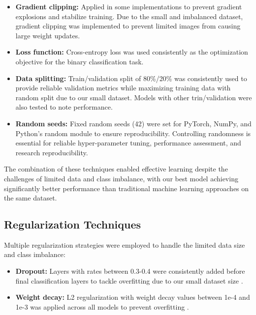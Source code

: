 \documentclass[a4paper,12pt]{report}
\begin{document}
\begin{itemize}
    \item \textbf{Gradient clipping:} Applied in some implementations to prevent gradient explosions and stabilize training. Due to the small and imbalanced dataset, gradient clipping was implemented to prevent limited images from causing large weight updates. 
    

    \item \textbf{Loss function:} Cross-entropy loss was used consistently as the optimization objective for the binary classification task.
    
    \item \textbf{Data splitting:} Train/validation split of 80\%/20\% was consistently used to provide reliable validation metrics while maximizing training data with random split due to our small dataset. Models with other trin/validation were also tested to note performance.
    
    \item \textbf{Random seeds:} Fixed random seeds (42) were set for PyTorch, NumPy, and Python's random module to ensure reproducibility. Controlling randomness is essential for reliable hyper-parameter tuning, performance assessment, and research reproducibility.

\end{itemize}

The combination of these techniques enabled effective learning despite the challenges of limited data and class imbalance, with our best model achieving significantly better performance than traditional machine learning approaches on the same dataset.

\subsection{Regularization Techniques}

Multiple regularization strategies were employed to handle the limited data size and class imbalance:

\begin{itemize}
    \item \textbf{Dropout:} Layers with rates between 0.3-0.4 were consistently added before final classification layers to tackle overfitting due to our small dataset size \citep{srivastava2014dropout}.
    \item \textbf{Weight decay:} L2 regularization with weight decay values between 1e-4 and 1e-3 was applied across all models to prevent overfitting \citep{krogh1992simple}.

\end{itemize}
\end{document}
